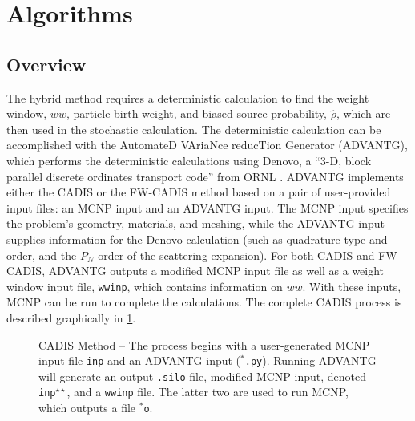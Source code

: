 \documentclass[10pt]{article}
\begin{document}
\section{Algorithms}
\label{sec:alg}

\subsection{Overview}

The hybrid method requires a deterministic calculation to find the weight window, $ww$, particle birth weight, and biased source probability, $\hat{\rho}$, which are then used in the stochastic calculation.
The deterministic calculation can be accomplished with the AutomateD VAriaNce reducTion Generator (ADVANTG), which performs the deterministic calculations using Denovo, a ``3-D, block parallel discrete ordinates transport code'' from ORNL \cite{software:advantg}.
ADVANTG implements either the CADIS or the FW-CADIS method based on a pair of user-provided input files: an MCNP input and an ADVANTG input. The MCNP input specifies the problem's geometry, materials, and meshing, while the ADVANTG input supplies information for the Denovo calculation (such as quadrature type and order, and the $P_{N}$ order of the scattering expansion).
For both CADIS and FW-CADIS, ADVANTG outputs a modified MCNP input file as well as a weight window input file, \texttt{wwinp}, which contains information on $ww$.
With these inputs, MCNP can be run to complete the calculations.
The complete CADIS process is described graphically in \cref{flow:cadis}.

\begin{figure}[!ht]

\caption{CADIS Method -- The process begins with a user-generated MCNP input file \texttt{inp} and an ADVANTG input (\texttt{$^\ast$.py}). Running ADVANTG will generate an output \texttt{.silo} file, modified MCNP input, denoted \texttt{inp}$^{\star\star}$, and a \texttt{wwinp} file. The latter two are used to run MCNP, which outputs a file $^\ast$\texttt{o}.}
\label{flow:cadis}
\end{figure}
\end{document}
